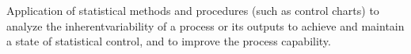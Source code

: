 Application of statistical methods and procedures (such as control charts) 
to analyze the inherentvariability of a process or its outputs to achieve and maintain 
a state of statistical control, and to improve the process capability. 
